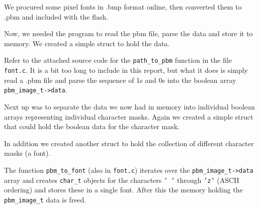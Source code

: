 We procured some pixel fonts in .bmp format online, then converted them to .pbm and included with the flash.

Now, we needed the program to read the pbm file, parse the data and store it to memory.
We created a simple struct to hold the data.



Refer to the attached source code for the \texttt{path\_to\_pbm} function in the file \texttt{font.c}.
It is a bit too long to include in this report, but what it does is simply read a .pbm file and parse the sequence of 1s and 0s into the boolean array \texttt{pbm\_image\_t->data}.

Next up was to separate the data we now had in memory into individual boolean arrays representing individual character masks.
Again we created a simple struct that could hold the boolean data for the character mask.



In addition we created another struct to hold the collection of different character masks (a font).



The function \texttt{pbm\_to\_font} (also in \texttt{font.c}) iterates over the \texttt{pbm\_image\_t->data} array and creates \texttt{char\_t} objects for the characters \texttt{' '} through \texttt{'z'} (ASCII ordering) and stores these in a single font.
After this the memory holding the \texttt{pbm\_image\_t} data is freed.

